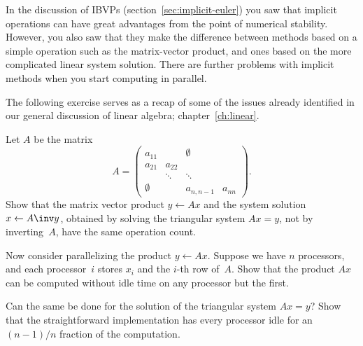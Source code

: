 
In the discussion of \acp{IBVP} (section~\ref{sec:implicit-euler}) you
saw that implicit operations can have great advantages from the point
of numerical stability. However, you also saw that they make the
difference between methods based on a simple operation such as the
matrix-vector product, and ones based on the more complicated linear
system solution. There are further problems with implicit methods when
you start computing in parallel.

The following exercise serves as a recap of some of the issues already
identified in our general discussion of linear algebra; chapter~\ref{ch:linear}.

\begin{exercise}
  Let $A$ be the matrix
  \begin{equation} A=
  \begin{pmatrix}
    a_{11}&&\emptyset\\ a_{21}&a_{22}\\ &\ddots&\ddots\\ 
    \emptyset&&a_{n,n-1}&a_{nn}
  \end{pmatrix}.\label{eq:ex:bidiagonal}
  \end{equation}
  Show that the matrix vector product $y\leftarrow Ax$ and the system
  solution $x\leftarrow A\inv y$, obtained by solving the
    triangular system $Ax=y$, not by inverting~$A$, have the same
  operation count.

  Now consider parallelizing the product $y\leftarrow Ax$. Suppose we
  have $n$ processors, and each processor~$i$ stores $x_i$ and the
  $i$-th row of~$A$. Show that the product $Ax$ can be computed without
  idle time on any processor but the first.

  Can the same be done for the solution of the triangular system
  $Ax=y$? Show that the straightforward implementation has every
  processor idle for an $(n-1)/n$ fraction of the computation.
\end{exercise}

